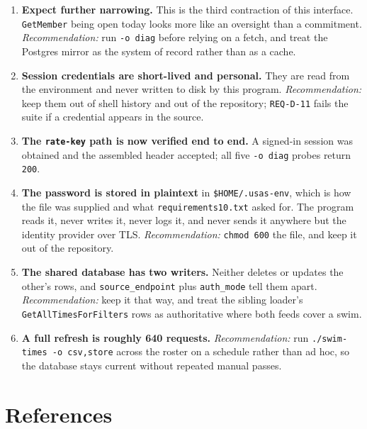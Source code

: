 \documentclass[11pt]{article}
\newcommand{\code}[1]{\texttt{#1}}
\newcommand{\req}[1]{\texttt{#1}}
\begin{document}
\begin{enumerate}[leftmargin=*]
\item \textbf{Expect further narrowing.}  This is the third contraction
      of this interface.  \code{GetMember} being open today looks more
      like an oversight than a commitment.  \emph{Recommendation:} run
      \code{-o diag} before relying on a fetch, and treat the Postgres
      mirror as the system of record rather than as a cache.
\item \textbf{Session credentials are short-lived and personal.}  They
      are read from the environment and never written to disk by this
      program.  \emph{Recommendation:} keep them out of shell history
      and out of the repository; \req{REQ-D-11} fails the suite if a
      credential appears in the source.
\item \textbf{The \code{rate-key} path is now verified end to end.}
      A signed-in session was obtained and the assembled header
      accepted; all five \code{-o diag} probes return \code{200}.
\item \textbf{The password is stored in plaintext} in
      \code{\$HOME/.usas-env}, which is how the file was supplied and
      what \code{requirements10.txt} asked for.  The program reads it,
      never writes it, never logs it, and never sends it anywhere but
      the identity provider over TLS.  \emph{Recommendation:}
      \code{chmod 600} the file, and keep it out of the repository.
\item \textbf{The shared database has two writers.}  Neither deletes
      or updates the other's rows, and \code{source\_endpoint} plus
      \code{auth\_mode} tell them apart.  \emph{Recommendation:} keep
      it that way, and treat the sibling loader's
      \code{GetAllTimesForFilters} rows as authoritative where both
      feeds cover a swim.
\item \textbf{A full refresh is roughly 640 requests.}
      \emph{Recommendation:} run \code{./swim-times -o csv,store}
      across the roster on a schedule rather than ad hoc, so the
      database stays current without repeated manual passes.
\end{enumerate}

\section{References}
\end{document}
